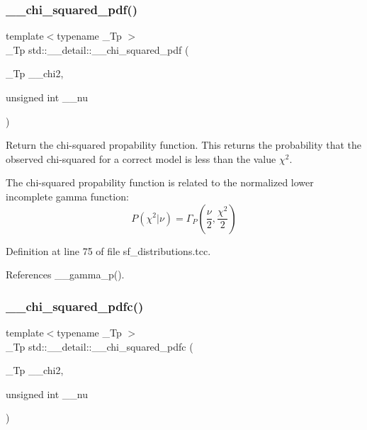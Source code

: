 \subsubsection{\texorpdfstring{\+\_\+\+\_\+chi\+\_\+squared\+\_\+pdf()}{\_\_chi\_squared\_pdf()}}
{\footnotesize\ttfamily template$<$typename \+\_\+\+Tp $>$ \\
\+\_\+\+Tp std\+::\+\_\+\+\_\+detail\+::\+\_\+\+\_\+chi\+\_\+squared\+\_\+pdf (\begin{DoxyParamCaption}\item[{\+\_\+\+Tp}]{\+\_\+\+\_\+chi2,  }\item[{unsigned int}]{\+\_\+\+\_\+nu }\end{DoxyParamCaption})}



Return the chi-\/squared propability function. This returns the probability that the observed chi-\/squared for a correct model is less than the value $ \chi^2 $. 

The chi-\/squared propability function is related to the normalized lower incomplete gamma function\+: \[ P(\chi^2|\nu) = \Gamma_P(\frac{\nu}{2}, \frac{\chi^2}{2}) \] 

Definition at line 75 of file sf\+\_\+distributions.\+tcc.



References \+\_\+\+\_\+gamma\+\_\+p().

\mbox{\label{namespacestd_1_1____detail_aa62c16dd75a7411400c7082e6b2b246b}} 
\subsubsection{\texorpdfstring{\+\_\+\+\_\+chi\+\_\+squared\+\_\+pdfc()}{\_\_chi\_squared\_pdfc()}}
{\footnotesize\ttfamily template$<$typename \+\_\+\+Tp $>$ \\
\+\_\+\+Tp std\+::\+\_\+\+\_\+detail\+::\+\_\+\+\_\+chi\+\_\+squared\+\_\+pdfc (\begin{DoxyParamCaption}\item[{\+\_\+\+Tp}]{\+\_\+\+\_\+chi2,  }\item[{unsigned int}]{\+\_\+\+\_\+nu }\end{DoxyParamCaption})}




